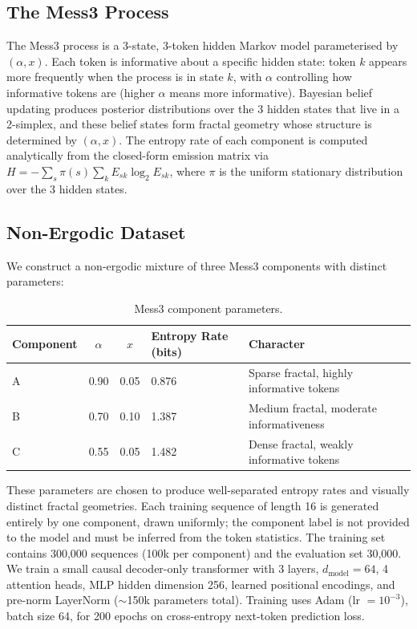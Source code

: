 \documentclass{article}
\begin{document}
\subsection{The Mess3 Process}

The Mess3 process \citep{shai2024} is a 3-state, 3-token hidden Markov model parameterised by $(\alpha, x)$. Each token is informative about a specific hidden state: token $k$ appears more frequently when the process is in state $k$, with $\alpha$ controlling how informative tokens are (higher $\alpha$ means more informative). Bayesian belief updating produces posterior distributions over the 3 hidden states that live in a 2-simplex, and these belief states form fractal geometry whose structure is determined by $(\alpha, x)$. The entropy rate of each component is computed analytically from the closed-form emission matrix via $H = -\sum_s \pi(s) \sum_k E_{sk} \log_2 E_{sk}$, where $\pi$ is the uniform stationary distribution over the 3 hidden states.

\subsection{Non-Ergodic Dataset}

We construct a non-ergodic mixture of three Mess3 components with distinct parameters:

\begin{table}[h]
\centering
\caption{Mess3 component parameters.}
\label{tab:components}
\begin{tabular}{@{}lccll@{}}
\toprule
Component & $\alpha$ & $x$ & Entropy Rate (bits) & Character \\
\midrule
A & 0.90 & 0.05 & 0.876 & Sparse fractal, highly informative tokens \\
B & 0.70 & 0.10 & 1.387 & Medium fractal, moderate informativeness \\
C & 0.55 & 0.05 & 1.482 & Dense fractal, weakly informative tokens \\
\bottomrule
\end{tabular}
\end{table}

These parameters are chosen to produce well-separated entropy rates and visually distinct fractal geometries. Each training sequence of length 16 is generated entirely by one component, drawn uniformly; the component label is not provided to the model and must be inferred from the token statistics. The training set contains 300,000 sequences (100k per component) and the evaluation set 30,000. We train a small causal decoder-only transformer with 3 layers, $d_\text{model} = 64$, 4 attention heads, MLP hidden dimension 256, learned positional encodings, and pre-norm LayerNorm ($\sim$150k parameters total). Training uses Adam (lr $= 10^{-3}$), batch size 64, for 200 epochs on cross-entropy next-token prediction loss.
\end{document}
